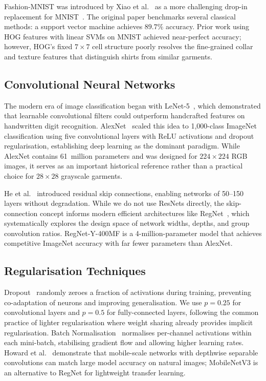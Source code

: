 \documentclass[conference]{IEEEtran}
\begin{document}
Fashion-MNIST was introduced by Xiao et al.~\cite{xiao2017fashionmnist} as
a more challenging drop-in replacement for MNIST~\cite{lecun1998gradient}.
The original paper benchmarks several classical methods: a support vector
machine achieves $89.7\%$ accuracy. Prior work using HOG features with
linear SVMs on MNIST achieved near-perfect accuracy; however, HOG's fixed
$7\times7$ cell structure poorly resolves the fine-grained collar and
texture features that distinguish shirts from similar garments.

\subsection{Convolutional Neural Networks}

The modern era of image classification began with LeNet-5~\cite{lecun1998gradient},
which demonstrated that learnable convolutional filters could outperform
handcrafted features on handwritten digit recognition. AlexNet~\cite{krizhevsky2012imagenet}
scaled this idea to 1,000-class ImageNet classification using five
convolutional layers with ReLU activations and dropout regularisation,
establishing deep learning as the dominant paradigm. While AlexNet contains
61~million parameters and was designed for $224\times224$ RGB images, it
serves as an important historical reference rather than a practical choice
for $28\times28$ grayscale garments.

He et al.~\cite{he2016deep} introduced residual skip connections, enabling
networks of 50--150 layers without degradation. While we do not use ResNets
directly, the skip-connection concept informs modern efficient architectures
like RegNet~\cite{radosavovic2020designing}, which systematically explores
the design space of network widths, depths, and group convolution ratios.
RegNet-Y-400MF is a 4-million-parameter model that achieves competitive
ImageNet accuracy with far fewer parameters than AlexNet.

\subsection{Regularisation Techniques}

Dropout~\cite{srivastava2014dropout} randomly zeroes a fraction of
activations during training, preventing co-adaptation of neurons and
improving generalisation. We use $p=0.25$ for convolutional layers and
$p=0.5$ for fully-connected layers, following the common practice of
lighter regularisation where weight sharing already provides implicit
regularisation. Batch Normalisation~\cite{ioffe2015batch} normalises
per-channel activations within each mini-batch, stabilising gradient flow
and allowing higher learning rates. Howard et al.~\cite{howard2019searching}
demonstrate that mobile-scale networks with depthwise separable convolutions
can match large model accuracy on natural images; MobileNetV3 is an
alternative to RegNet for lightweight transfer learning.
\end{document}
